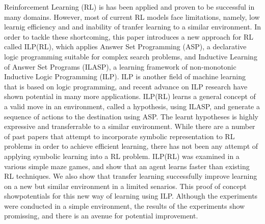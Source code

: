 Reinforcement Learning (RL) is has been applied and proven to be successful in many domains.
However, most of current RL models face limitations, namely, low learnig efficiency and and inability of tranfer learning to a similar environment.
In order to tackle these shortcoming, this paper introduces a new approach for RL called ILP(RL), 
which applies Answer Set Programming (ASP), a declarative logic programming suitable for complex search problems, 
and Inductive Learning of Answer Set Programs (ILASP), a learning framework of non-monotonic Inductive Logic Programming (ILP).
ILP is another field of machine learning that is based on logic programming, and recent advance on ILP research have shown potential in many more applications.
ILP(RL) learns a general concept of a valid move in an environment, called a hypothesis, using ILASP, and generate a sequence of actions to the destination using ASP.
The learnt hypotheses is highly expressive and transferrable to a similar environment. 
While there are a number of past papers that attempt to incorporate symbolic representation to RL problems in order to achieve efficient learning, 
there has not been any attempt of applying symbolic learning into a RL problem.
ILP(RL) was examined in a various simple maze games, and show that an agent learns faster than existing RL techniques.
We also show that transfer learning successfully improve learning on a new but similar environment in a limited senarios.
This proof of concept showpotentials for this new way of learning using ILP.
Although the experiments were conducted in a simple environment, the results of the experiments show promissing, and there is an avenue for potential improvement.
